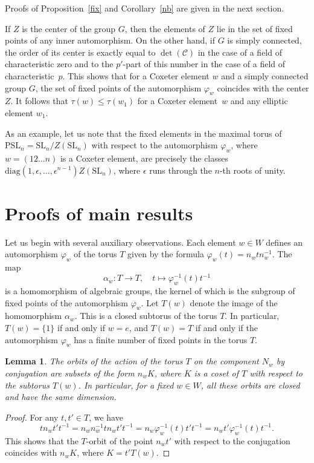 \documentclass[a4paper,12pt]{amsart}
\theoremstyle{plain}
\newtheorem{lemma}{Lemma}
\theoremstyle{definition}
\newcommand{\SL}{\mathrm{SL}}
\newcommand{\PSL}{\mathrm{PSL}}
\begin{document}
\noindent Proofs of Proposition~\ref{fix} and Corollary~\ref{nb} are given in the next section.

\smallskip

If $Z$ is the center of the group $G$, then the elements of $Z$ lie in the set of fixed points of any inner automorphism. On the other hand, if $G$ is simply connected, the order of its center is exactly equal to $\det(\mathcal{C})$ in the case of a field of characteristic zero and to the $p'$-part of this number in the case of a field of characteristic~$p$. This shows that for a Coxeter element $w$ and a simply connected group $G$, the set of fixed points of the automorphism $\varphi_w$ coincides with the center $Z$. It follows that $\tau(w) \le \tau(w_1)$ for a Coxeter element~$w$ and any elliptic element $w_1$.

As an example, let us note that the fixed elements in the maximal torus of $\PSL_n=\SL_n/Z(\SL_n)$ with respect to the automorphism $\varphi_w$, where $w=(12\ldots n)$ is a Coxeter element, are precisely the classes $\text{diag}(1,\epsilon,\ldots,\epsilon^{n-1})Z(\SL_n)$, where $\epsilon$ runs through the $n$-th roots of unity.

\section{Proofs of main results}

Let us begin with several auxiliary observations. Each element $w\in W$ defines an automorphism $\varphi_w$ of the torus $T$ given by the formula $\varphi_w(t)=n_wtn_w^{-1}$.
The map
 $$
 \alpha_w\colon T\to T,  \quad t\mapsto \varphi_w^{-1}(t)t^{-1}
 $$
is a homomorphism of algebraic groups, the kernel of which is the subgroup of fixed points of the automorphism $\varphi_w$. Let $T(w)$ denote the image of the homomorphism $\alpha_w$. This is a closed subtorus of the torus $T$. In particular, $T(w)=\{1\}$ if and only if $w=e$, and $T(w)=T$ if and only if the automorphism $\varphi_w$ has a finite number of fixed points in the torus $T$.

\begin{lemma} \label{lem}
The orbits of the action of the torus $T$ on the component $N_w$ by conjugation are subsets of the form $n_wK$, where $K$ is a coset of $T$ with respect to the subtorus $T(w)$. In particular, for a fixed $w\in W$, all these orbits are closed and have the same dimension.
\end{lemma}

\begin{proof}
For any $t,t'\in T$, we have
$$
tn_wt't^{-1}=n_wn_w^{-1}tn_wt't^{-1}=n_w\varphi_w^{-1}(t)t't^{-1}=n_wt'\varphi_w^{-1}(t)t^{-1}.
$$
This shows that the $T$-orbit of the point $n_wt'$ with respect to the conjugation coincides with $n_wK$, where $K=t'T(w)$.
\end{proof}
\end{document}
